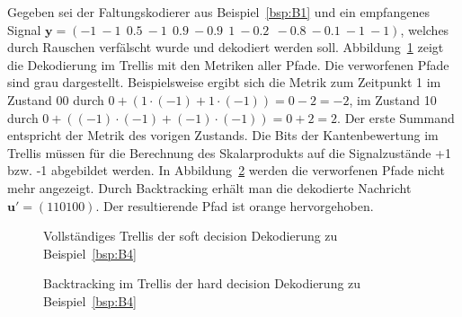 \begin{beispiel}
Gegeben sei der Faltungskodierer aus Beispiel~\ref{bsp:B1} und ein empfangenes Signal $\mathbf{y}=\left( -1~-1~~0.5~-1~~0.9~-0.9~~1~-0.2~~-0.8~-0.1~-1~-1\right)$, welches durch Rauschen verfälscht wurde und dekodiert werden soll. Abbildung~\ref{abb:trellis_dek_soft_a} zeigt die Dekodierung im Trellis mit den Metriken aller Pfade. Die verworfenen Pfade sind grau dargestellt. Beispielsweise ergibt sich die Metrik zum Zeitpunkt 1 im Zustand 00 durch $0+\left( 1\cdot\left( -1\right) + 1\cdot\left( -1\right)\right) =0-2=-2$, im Zustand 10 durch $0+\left( \left( -1\right)\cdot\left( -1\right) + \left( -1\right)\cdot\left( -1\right)\right) =0+2=2$. Der erste Summand entspricht der Metrik des vorigen Zustands. Die Bits der Kantenbewertung im Trellis müssen für die Berechnung des Skalarprodukts auf die Signalzustände +1 bzw. -1 abgebildet werden. In Abbildung~\ref{abb:trellis_dek_soft_b} werden die verworfenen Pfade nicht mehr angezeigt. Durch Backtracking erhält man die dekodierte Nachricht $\mathbf{u'}=\left( 110100\right)$. Der resultierende Pfad ist orange hervorgehoben.
\label{bsp:B4}
\end{beispiel}

\begin{figure}[t]
	\centering
	\resizebox{0.75\textwidth}{!}{%
		
	}
	\caption{Vollständiges Trellis der soft decision Dekodierung zu Beispiel~\ref{bsp:B4}}
	\label{abb:trellis_dek_soft_a}
\end{figure}
\begin{figure}[t]
	\centering
	\resizebox{0.75\textwidth}{!}{%
		
	}
	\caption{Backtracking im Trellis der hard decision Dekodierung zu Beispiel~\ref{bsp:B4}}
	\label{abb:trellis_dek_soft_b}
\end{figure}

%				
%				

